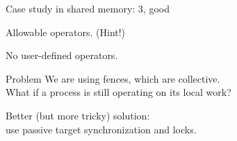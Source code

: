 \begin{mpithree}
\begin{numberedframe}{Case study in shared memory: 3, good}
  \label{sl:fetchacc}
\end{numberedframe}

\begin{numberedframe}{Allowable operators. (Hint!)}
  

  No user-defined operators.
\end{numberedframe}

\begin{numberedframe}{Problem}
  We are using fences, which are collective.\\
  What if a process is still operating on its local work?

  Better (but more tricky) solution:\\
  use passive target synchronization and locks.
\end{numberedframe}

\begin{exerciseframe}[lockfetch]
  
\end{exerciseframe}

\begin{exerciseframe}[lockfetchshared]
  
\end{exerciseframe}

\end{mpithree}

\endinput

\begin{numberedframe}{}
  \label{sl:}
\end{numberedframe}

\begin{optexerciseframe}
  
\end{optexerciseframe}

